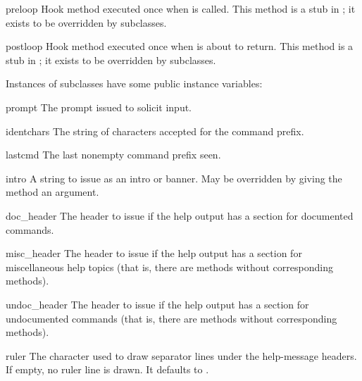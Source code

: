 \begin{methoddesc}{preloop}{}
Hook method executed once when  is called.  This
method is a stub in ; it exists to be overridden by
subclasses.
\end{methoddesc}

\begin{methoddesc}{postloop}{}
Hook method executed once when  is about to return.
This method is a stub in ; it exists to be overridden by
subclasses.
\end{methoddesc}

Instances of  subclasses have some public instance variables:

\begin{memberdesc}{prompt}
The prompt issued to solicit input.
\end{memberdesc}

\begin{memberdesc}{identchars}
The string of characters accepted for the command prefix.
\end{memberdesc}

\begin{memberdesc}{lastcmd}
The last nonempty command prefix seen. 
\end{memberdesc}

\begin{memberdesc}{intro}
A string to issue as an intro or banner.  May be overridden by giving
the  method an argument.
\end{memberdesc}

\begin{memberdesc}{doc_header}
The header to issue if the help output has a section for documented
commands.
\end{memberdesc}

\begin{memberdesc}{misc_header}
The header to issue if the help output has a section for miscellaneous 
help topics (that is, there are  methods without
corresponding  methods).
\end{memberdesc}

\begin{memberdesc}{undoc_header}
The header to issue if the help output has a section for undocumented 
commands (that is, there are  methods without
corresponding  methods).
\end{memberdesc}

\begin{memberdesc}{ruler}
The character used to draw separator lines under the help-message
headers.  If empty, no ruler line is drawn.  It defaults to
\character{=}.
\end{memberdesc}

